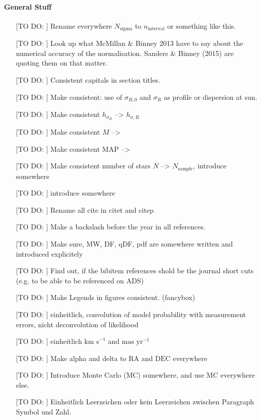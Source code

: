 \paragraph{General Stuff}
\begin{itemize}
\item[[TO DO:]] Rename everywhere $N_\text{sigma}$ to $n_\text{interval}$ or something like this.
\item[[TO DO:]] Look up what McMillan \& Binney 2013 have to say about the numerical accuracy of the normalisation. Sanders \& Binney (2015) are quoting them on that matter.
\item[[TO DO:]] Consistent capitals in section titles.
\item[[TO DO:]] Make consistent: use of $\sigma_{R,0}$ and $\sigma_R$ as profile or dispersion at sun.
\item[[TO DO:]] Make consistent $h_{\sigma_R}$ --> $h_{\sigma,R}$
\item[[TO DO:]] Make consistent $M$ --> \pmodel
\item[[TO DO:]] Make consistent MAP --> \MAP
\item[[TO DO:]] Make consistent number of stars $N$ --> $N_\text{sample}$, introduce somewhere
\item[[TO DO:]]  introduce \pdf somewhere
\item[[TO DO:]]  Rename all cite in citet and citep
\item[[TO DO:]] Make a backslash before the year in all references.
\item[[TO DO:]] Make sure, MW, DF, qDF, pdf are somewhere written and introduced explicitely
\item[[TO DO:]] Find out, if the bibitem references shold be the journal short cuts (e.g. to be able to be referenced on ADS)
\item[[TO DO:]] Make Legends in figures consistent. (fancybox)
\item[[TO DO:]] einheitlich, convolution of model probability with measurement errors, nicht deconvolution of likelihood
\item[[TO DO:]] einheitlich $\text{km s}^{-1}$ and $\text{mas yr}^{-1}$
\item[[TO DO:]] Make alpha and delta to $\text{RA}$ and $\text{DEC}$ everywhere
\item[[TO DO:]] Introduce Monte Carlo (MC) somewhere, and use MC everywhere else.
\item[[TO DO:]] Einheitlich Leerzeichen oder kein Leerzeichen zwischen Paragraph Symbol und Zahl.
\end{itemize}


